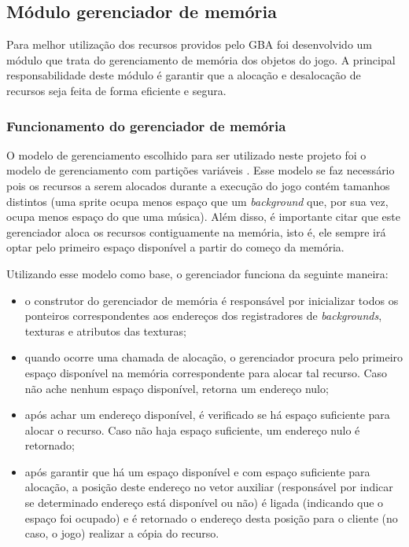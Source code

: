 \subsection{Módulo gerenciador de memória}

Para melhor utilização dos recursos providos pelo GBA foi desenvolvido um módulo que trata do gerenciamento de memória dos objetos do jogo. A principal responsabilidade deste módulo é garantir que a alocação e desalocação de recursos seja feita de forma eficiente e segura.

    \subsubsection{Funcionamento do gerenciador de memória}

    O modelo de gerenciamento escolhido para ser utilizado neste projeto foi o modelo de gerenciamento com partições variáveis \cite{tanenbaum}. Esse modelo se faz necessário pois os recursos a serem alocados durante a execução do jogo contém tamanhos distintos (uma sprite ocupa menos espaço que um \textit{background} que, por sua vez, ocupa menos espaço do que uma música). Além disso, é importante citar que este gerenciador aloca os recursos contiguamente na memória, isto é, ele sempre irá optar pelo primeiro espaço disponível a partir do começo da memória.

    Utilizando esse modelo como base, o gerenciador funciona da seguinte maneira:

    \begin{itemize}
        \item o construtor do gerenciador de memória é responsável por inicializar todos os ponteiros correspondentes aos endereços dos registradores de \textit{backgrounds}, texturas e atributos das texturas;
        \item quando ocorre uma chamada de alocação, o gerenciador procura pelo primeiro espaço disponível na memória correspondente para alocar tal recurso. Caso não ache nenhum espaço disponível, retorna um endereço nulo;
        \item após achar um endereço disponível, é verificado se há espaço suficiente para alocar o recurso. Caso não haja espaço suficiente, um endereço nulo é retornado;
        \item após garantir que há um espaço disponível e com espaço suficiente para alocação, a posição deste endereço no vetor auxiliar (responsável por indicar se determinado endereço está disponível ou não) é ligada (indicando que o espaço foi ocupado) e é retornado o endereço desta posição para o cliente (no caso, o jogo) realizar a cópia do recurso.
    \end{itemize}

